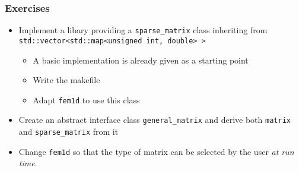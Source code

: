 \documentclass[smaller,a4paper]{beamer}
\newcommand{\cpp}[1]{\lstinline!#1!}
\begin{document}
\begin{frame}\frametitle{Exercises}
\begin{itemize}
\item Implement a libary providing a \cpp{sparse_matrix} class inheriting 
      from \cpp{std::vector<std::map<unsigned int, double> >} \\[2mm]
\begin{itemize}
\item A basic implementation is already given as a starting point \\[2mm]
\item Write the makefile \\[2mm]
\item Adapt \cpp{fem1d} to use this class \\[2mm]
\end{itemize}
\item Create an abstract interface class \cpp{general_matrix} and derive 
both \cpp{matrix} and \cpp{sparse_matrix} from it \\[2mm]
\item Change \cpp{fem1d} so that the type of matrix can be selected by the user \emph{at run time}. 
\end{itemize}

\end{frame}
\end{document}
